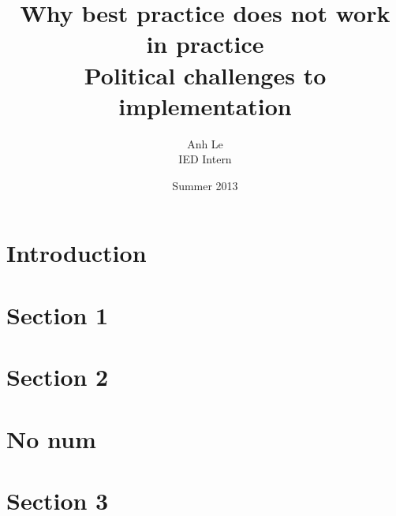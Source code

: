 \documentclass[12pt]{article}
\title{Why best practice does not work in practice \\
Political challenges to implementation}
\author{Anh Le \\
IED Intern}
\date{Summer 2013}
\begin{document}
\maketitle

\section*{Introduction}

\section{Section 1}

\section{Section 2}

\section*{No num}

\section*{Section 3}
\end{document}
